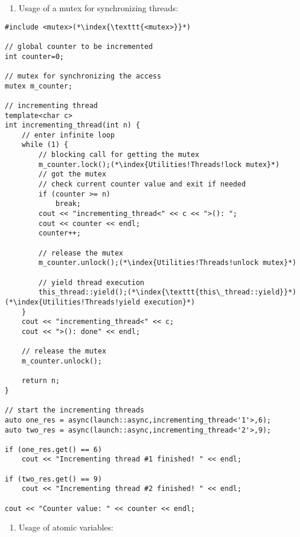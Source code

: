 \documentclass[10pt]{book}
\begin{document}
\begin{enumerate}
\item[] Usage of a mutex for synchronizing threads:
\end{enumerate}
\begin{lstlisting}
#include <mutex>(*\index{\texttt{<mutex>}}*)

// global counter to be incremented
int counter=0;

// mutex for synchronizing the access
mutex m_counter;

// incrementing thread
template<char c>
int incrementing_thread(int n) {
    // enter infinite loop
    while (1) {
        // blocking call for getting the mutex
        m_counter.lock();(*\index{Utilities!Threads!lock mutex}*)
        // got the mutex
        // check current counter value and exit if needed
        if (counter >= n)
            break;
        cout << "incrementing_thread<" << c << ">(): ";
        cout << counter << endl;
        counter++;
        
        // release the mutex
        m_counter.unlock();(*\index{Utilities!Threads!unlock mutex}*)
        
        // yield thread execution
        this_thread::yield();(*\index{\texttt{this\_thread::yield}}*)(*\index{Utilities!Threads!yield execution}*)
    }
    cout << "incrementing_thread<" << c;
    cout << ">(): done" << endl;
    
    // release the mutex
    m_counter.unlock();
    
    return n;
}

// start the incrementing threads
auto one_res = async(launch::async,incrementing_thread<'1'>,6);
auto two_res = async(launch::async,incrementing_thread<'2'>,9);

if (one_res.get() == 6)
    cout << "Incrementing thread #1 finished! " << endl;
    
if (two_res.get() == 9)
    cout << "Incrementing thread #2 finished! " << endl;
    
cout << "Counter value: " << counter << endl;
\end{lstlisting}
\begin{enumerate}
\item[] Usage of atomic variables:
\end{enumerate}
\end{document}
